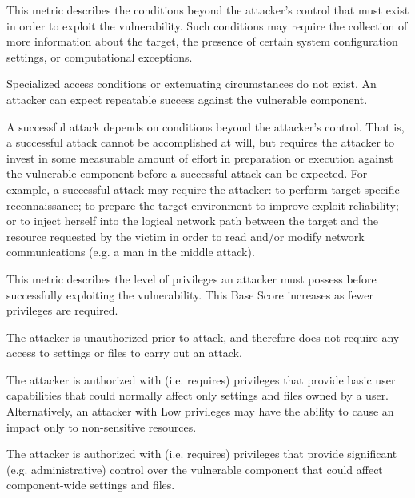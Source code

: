 \begin{description}[itemsep=1em,align=left]
\begin{description}[noitemsep,align=left]
            \end{description}
        \item [Attack Complexity:] This metric describes the conditions beyond the attacker’s control that must exist in order to exploit the vulnerability. Such conditions may require the collection of more information about the target, the presence of certain system configuration settings, or computational exceptions.
            \begin{description}[noitemsep,align=left]
                \item [Low:] Specialized access conditions or extenuating circumstances do not exist. An attacker can expect repeatable success against the vulnerable component.
                \item [High:] A successful attack depends on conditions beyond the attacker's control. 
                    That is, a successful attack cannot be accomplished at will, but requires the attacker to invest in some measurable amount of effort in preparation or execution against the vulnerable component before a successful attack can be expected. 
                        For example, a successful attack may require the attacker: to perform target-specific reconnaissance; to prepare the target environment to improve exploit reliability; or to inject herself into the logical network path between the target and the resource requested by the victim in order to read and/or modify network communications (e.g. a man in the middle attack).
            \end{description}
        \item [Privileges Required:] This metric describes the level of privileges an attacker must possess before successfully exploiting the vulnerability. 
            This Base Score increases as fewer privileges are required.
            \begin{description}[noitemsep,align=left]
                \item [None:] The attacker is unauthorized prior to attack, and therefore does not require any access to settings or files to carry out an attack.
                \item [Low:] The attacker is authorized with (i.e. requires) privileges that provide basic user capabilities that could normally affect only settings and files owned by a user. 
                    Alternatively, an attacker with Low privileges may have the ability to cause an impact only to non-sensitive resources.
                \item [High:] The attacker is authorized with (i.e. requires) privileges that provide significant (e.g. administrative) control over the vulnerable component that could affect component-wide settings and files.

\end{description}
\end{description}

